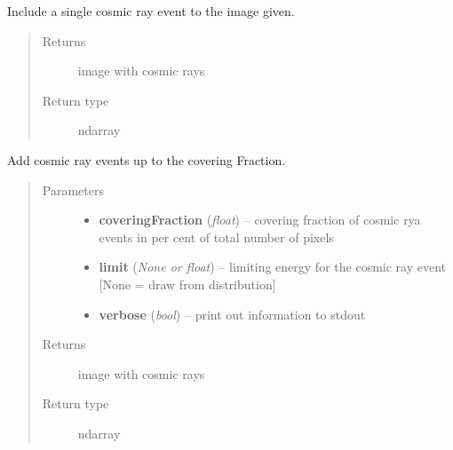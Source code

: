 \documentclass[a4paper,11pt,english]{sphinxmanual}
\begin{document}
\begin{fulllineitems}
\begin{fulllineitems}
\label{support:support.cosmicrays.cosmicrays.addSingleEvent}
Include a single cosmic ray event to the image given.
\begin{quote}\begin{description}
\item[{Returns}] \leavevmode
image with cosmic rays

\item[{Return type}] \leavevmode
ndarray

\end{description}\end{quote}

\end{fulllineitems}


\begin{fulllineitems}
\label{support:support.cosmicrays.cosmicrays.addUpToFraction}
Add cosmic ray events up to the covering Fraction.
\begin{quote}\begin{description}
\item[{Parameters}] \leavevmode\begin{itemize}
\item {} 
\textbf{coveringFraction} (\emph{float}) -- covering fraction of cosmic rya events in per cent of total number of pixels

\item {} 
\textbf{limit} (\emph{None or float}) -- limiting energy for the cosmic ray event {[}None = draw from distribution{]}

\item {} 
\textbf{verbose} (\emph{bool}) -- print out information to stdout

\end{itemize}

\item[{Returns}] \leavevmode
image with cosmic rays

\item[{Return type}] \leavevmode
ndarray

\end{description}\end{quote}

\end{fulllineitems}


\end{fulllineitems}
\end{document}
